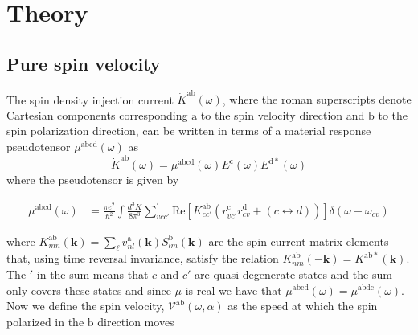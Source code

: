 \documentclass[prb,11pt,tightenlines,twocolumn,aps]{revtex4-1}
\begin{document}
\section{Theory} %
\label{sec:theory}




\subsection{Pure spin velocity} %
\label{sec:theory-pure_spin_current}

The spin density injection current $\dot{K}^{\mathrm{ab}}(\omega)$, 
% 
{
\color{red}
where the
roman superscripts denote Cartesian components corresponding $\mathrm{a}$ to the
spin velocity direction and $\mathrm{b}$ to the spin polarization direction, can
be written in terms of a material response pseudotensor
$\mu^{\mathrm{abcd}}(\omega)$ as
}
\begin{equation*}
\dot{K}^{\mathrm{ab}}(\omega) = \mu^{\mathrm{abcd}}(\omega)
E^{\mathrm{c}}(\omega) E^{\mathrm{d*}}(\omega)
\label{eq:dotk}
\end{equation*}
where the pseudotensor is given by\cite{bhatPRL05}
\begin{widetext}
\begin{align}
\mu^{\mathrm{abcd}} (\omega) 
&=
\frac{\pi e^{2}}{\hbar^{2}} \int 
\frac{d^{3}K}{8 \pi^{3}}
\sum_{vcc'}^{'}
\mathrm{Re} \left[ K^{\mathrm{ab}}_{cc'} 
\left( 
r^{\mathrm{c}}_{vc'} 
r^{\mathrm{d}}_{cv } +
(c \leftrightarrow d)
\right) 
\right]
\delta(\omega-\omega_{cv})
\label{eq:mu}
\end{align}
\end{widetext}
{\color{red}
where $K^{\mathrm{ab}}_{mn}(\mathbf{k}) =
\sum_{\ell}v^{\mathrm{a}}_{nl}(\mathbf{k}) S^{\mathrm{b}}_{lm}(\mathbf{k})$ are
the spin current matrix elements that, using time reversal invariance, satisfy
the relation $K^{\mathrm{ab}}_{nm}(\mathbf{-k}) = K^{\mathrm{ab*}}(\mathbf{k})
$. 
}%
The $'$ in the sum means that $c$ and $c'$ are quasi degenerate states and
the sum only covers these states and 
{\color{red}
since $\mu$ is real we have that
$\mu^{\mathrm{abcd}}(\omega) = \mu^{\mathrm{abdc}}(\omega)$.
}
Now we define the spin velocity, $\mathcal{V}^{\mathrm{ab}}(\omega,\alpha)$ as
the speed at which the spin polarized in the $\mathrm{b}$   direction moves
\end{document}
